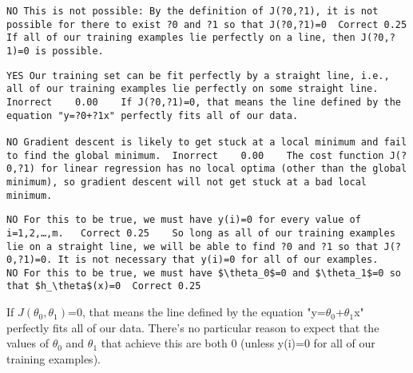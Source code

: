 \documentclass[]{article}
\begin{document}
\begin{verbatim}
NO This is not possible: By the definition of J(?0,?1), it is not possible for there to exist ?0 and ?1 so that J(?0,?1)=0	Correct	0.25	If all of our training examples lie perfectly on a line, then J(?0,?1)=0 is possible.
\end{verbatim}
\begin{verbatim}
YES Our training set can be fit perfectly by a straight line, i.e., all of our training examples lie perfectly on some straight line.	Inorrect	0.00	If J(?0,?1)=0, that means the line defined by the equation "y=?0+?1x" perfectly fits all of our data.

NO Gradient descent is likely to get stuck at a local minimum and fail to find the global minimum.	Inorrect	0.00	The cost function J(?0,?1) for linear regression has no local optima (other than the global minimum), so gradient descent will not get stuck at a bad local minimum.
\end{verbatim}
\begin{verbatim}
NO For this to be true, we must have y(i)=0 for every value of i=1,2,…,m.	Correct	0.25	So long as all of our training examples lie on a straight line, we will be able to find ?0 and ?1 so that J(?0,?1)=0. It is not necessary that y(i)=0 for all of our examples.
NO For this to be true, we must have $\theta_0$=0 and $\theta_1$=0 so that $h_\theta$(x)=0	Correct	0.25	
\end{verbatim}

If $J(\theta_0, \theta_1)$=0, that means the line defined by the equation "y=$\theta_0$+$\theta_1$x" perfectly fits all of our data. 
There's no particular reason to expect that the values of $\theta_0$ and $\theta_1$ that achieve this are both 0 (unless y(i)=0 for all of our training examples).
\end{document}
